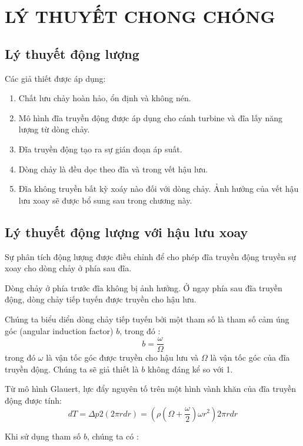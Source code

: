 \documentclass[13.5pt,twoside,a4paper]{extbook}
\begin{document}
\chapter{LÝ THUYẾT CHONG CHÓNG}
\section{Lý thuyết động lượng}

Các giả thiết được áp dụng:
\begin{enumerate}
    \item Chất lưu chảy hoàn hảo, ổn định và không nén.
    \item Mô hình đĩa truyền động được áp dụng cho cánh turbine và đĩa lấy năng lượng từ dòng chảy.
    \item Đĩa truyền động tạo ra sự gián đoạn áp suất.
    \item Dòng chảy là đều dọc theo đĩa và trong vết hậu lưu.
    \item Đĩa không truyền bất kỳ xoáy nào đối với dòng chảy. Ảnh hưởng của vết hậu lưu xoay sẽ được bổ sung sau trong chương này.
\end{enumerate}

\section{Lý thuyết động lượng với hậu lưu xoay}
Sự phân tích động lượng được điều chỉnh để cho phép đĩa truyền động truyền sự xoay cho dòng chảy ở phía sau đĩa.

Dòng chảy ở phía trước đĩa không bị ảnh hưởng. Ở ngay phía sau đĩa truyền động, dòng chảy tiếp tuyến được truyền cho hậu lưu.

Chúng ta biểu diển dòng chảy tiếp tuyến bởi một tham số là tham số cảm úng góc (angular induction factor) $b$, trong đó :
$$
b=\frac{\omega}{\Omega}
$$
trong đó $\omega$ là vận tốc góc được truyền cho hậu lưu và $\Omega$ là vận tốc góc của đĩa truyền động. Chúng ta sẽ giả thiết là $b$ không đáng kể so với 1.

Từ mô hình Glauert, lực đẩy nguyên tố trên một hình vành khăn của đĩa truyền động được tính:
\[dT = \Delta p2\left( {2\pi rdr} \right) = \left( {\rho \left( {\Omega  + \frac{\omega }{2}} \right)\omega {r^2}} \right)2\pi rdr\]

Khi sử dụng tham số $b$, chúng ta có :
\end{document}
